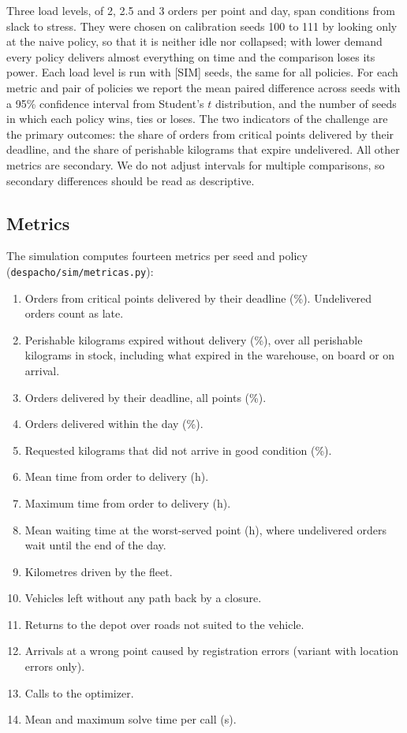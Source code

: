 \documentclass[11pt]{article}
\newcommand{\pend}[1]{\textcolor{red!60!black}{#1}}
\newcommand{\code}[1]{\texttt{\small #1}}
\begin{document}
Three load levels, of 2, 2.5 and 3 orders per point and day, span conditions from slack to stress. They were chosen on calibration seeds 100 to 111 by looking only at the naive policy, so that it is neither idle nor collapsed; with lower demand every policy delivers almost everything on time and the comparison loses its power. Each load level is run with \pend{[SIM]} seeds, the same for all policies. %
For each metric and pair of policies we report the mean paired difference across seeds with a 95\% confidence interval from Student's $t$ distribution, and the number of seeds in which each policy wins, ties or loses. The two indicators of the challenge are the primary outcomes: the share of orders from critical points delivered by their deadline, and the share of perishable kilograms that expire undelivered. All other metrics are secondary. We do not adjust intervals for multiple comparisons, so secondary differences should be read as descriptive. %

\subsection{Metrics}

The simulation computes fourteen metrics per seed and policy (\code{despacho/sim/metricas.py}):
\begin{enumerate}[label=M\arabic*.]
\item Orders from critical points delivered by their deadline (\%). Undelivered orders count as late.
\item Perishable kilograms expired without delivery (\%), over all perishable kilograms in stock, including what expired in the warehouse, on board or on arrival.
\item Orders delivered by their deadline, all points (\%).
\item Orders delivered within the day (\%).
\item Requested kilograms that did not arrive in good condition (\%).
\item Mean time from order to delivery (h).
\item Maximum time from order to delivery (h).
\item Mean waiting time at the worst-served point (h), where undelivered orders wait until the end of the day.
\item Kilometres driven by the fleet.
\item Vehicles left without any path back by a closure.
\item Returns to the depot over roads not suited to the vehicle.
\item Arrivals at a wrong point caused by registration errors (variant with location errors only).
\item Calls to the optimizer.
\item Mean and maximum solve time per call (s).
\end{enumerate}
\end{document}
